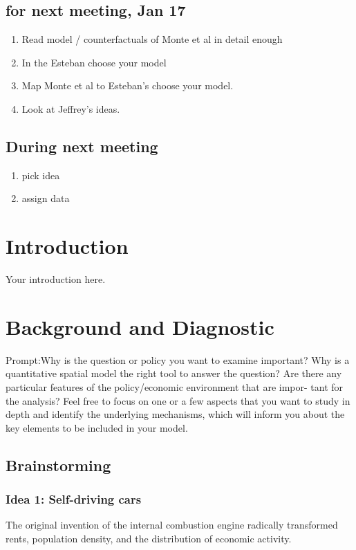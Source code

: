 \documentclass{article}
\begin{document}
\subsection{ for next meeting, Jan 17 }
\begin{enumerate}
    \item Read model / counterfactuals of Monte et al in detail enough 
    \item In the Esteban choose your model 
    \item Map Monte et al to Esteban's choose your model. 
    \item Look at Jeffrey's ideas. 
\end{enumerate}



\subsection{During next meeting}
\begin{enumerate}
    \item pick idea
    \item assign data 
\end{enumerate}


\section{Introduction}
\label{sec:intro}
Your introduction here.

\section{Background and Diagnostic}
Prompt:Why is the question or policy you want to examine
important? Why is a quantitative spatial model the right tool to answer the question?
Are there any particular features of the policy/economic environment that are impor-
tant for the analysis? Feel free to focus on one or a few aspects that you want to study
in depth and identify the underlying mechanisms, which will inform you about the key
elements to be included in your model.
\subsection{Brainstorming }

\subsubsection{Idea 1: Self-driving cars}
The original invention of the internal combustion engine
radically transformed rents, population density, and the distribution of economic activity. 
\end{document}
